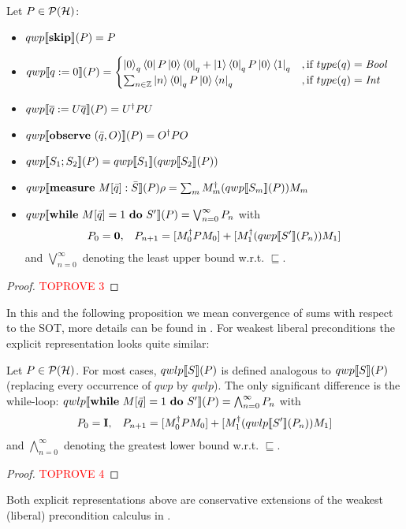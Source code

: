 \documentclass[a4paper,UKenglish,cleveref, autoref, thm-restate]{lipics-v2021}
\begin{document}
\begin{proposition}
    \label{prop:wpDef}
    Let $P \in \mathcal{P}(\mathcal{H})$:
    \begin{itemize}
        \item $qwp\llbracket \mathbf{skip} \rrbracket (P)=P$
        \item $qwp\llbracket q:=0 \rrbracket (P)=
        \begin{cases}
            \ket{0}_q\bra{0}P\ket{0} \bra{0}_q + \ket{1}\bra{0}_q P \ket{0} \bra{1}_q &
         ,\text{if }type(q)=\mathit{Bool} \\
            \sum_{n\in \mathbb{Z}} \ket{n} \bra{0}_q P \ket{0}\bra{n}_q&
        ,\text{if }type(q)=\mathit{Int}
        \end{cases}$
        \item $qwp\llbracket \overline{q}:= U\overline{q} \rrbracket (P)= U^\dagger P U$
        \item $qwp\llbracket \mathbf{observe } \text{ }(\Bar{q},O) \rrbracket (P) = O^\dagger P O$
        \item $qwp\llbracket S_1;S_2 \rrbracket (P)=qwp\llbracket S_1 \rrbracket (qwp\llbracket S_2 \rrbracket (P))$
        \item $qwp\llbracket \mathbf{measure } \text{ }M[\Bar{q}]:\Bar{S} \rrbracket (P)\rho  = \sum_m M_m^\dagger (qwp\llbracket S_m \rrbracket (P)) M_m$
        \item $qwp\llbracket \mathbf{while } \text{ }M[\Bar{q}]=1 \text{ }\mathbf{ do } \text{ }S' \rrbracket (P) = \bigvee_{n=0}^\infty P_n$ with
        \begin{align*}
            P_0  = \mathbf{0}, &&
            P_{n+1} = [M_0^\dagger P  M_0] + [M_1^\dagger(qwp\llbracket S' \rrbracket (P_n)) M_1]
        \end{align*}
        and $\bigvee_{n=0}^\infty$ denoting the least upper bound w.r.t. $\sqsubseteq$.
    \end{itemize}
\end{proposition}
\begin{proof}\textcolor{red}{TOPROVE 3}\end{proof}
In this and the following proposition we mean convergence of sums with respect to the SOT, more details can be found in \cite{heisenbergdualityUnruh}.
For weakest liberal preconditions the explicit representation looks quite similar:
\begin{proposition}
    \label{prop:wlpDef}
    Let $P \in \mathcal{P}(\mathcal{H})$. For most cases, $qwlp\llbracket S \rrbracket (P)$ is defined analogous to $qwp\llbracket S \rrbracket (P)$ (replacing every occurrence of $qwp$ by $qwlp$). The only significant difference is the while-loop:
    $qwlp\llbracket \mathbf{while } \text{ }M[\Bar{q}]=1 \text{ }\mathbf{ do } \text{ }S' \rrbracket (P) = \bigwedge_{n=0}^\infty P_n$ with
        \begin{align*}
            P_0  =\textbf{I}, &&
            P_{n+1} = [M_0^\dagger P  M_0] + [M_1^\dagger(qwlp\llbracket S' \rrbracket (P_n)) M_1]
        \end{align*}
        and $\bigwedge_{n=0}^\infty$ denoting the greatest lower bound w.r.t. $\sqsubseteq$.
\end{proposition}
\begin{proof}\textcolor{red}{TOPROVE 4}\end{proof}
Both explicit representations above are conservative extensions of the weakest (liberal) precondition calculus in \cite{floydHoareLogic}.
\end{document}
